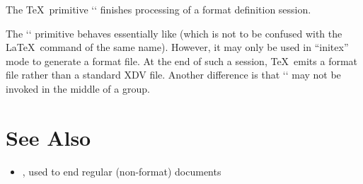 
The \TeX\ primitive \tex`\dump` finishes processing of a format definition
session.

The \tex`\dump` primitive behaves essentially like  (which is not to be
confused with the \LaTeX\ command of the same name). However, it may only be
used in “initex” mode to generate a format file. At the end of such a session,
\TeX\ emits a format file rather than a standard XDV file. Another difference is
that \tex`\dump` may not be invoked in the middle of a group.

\section*{See Also}

\begin{itemize}
\item {}, used to end regular (non-format) documents
\end{itemize}
